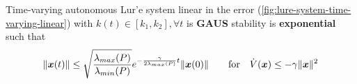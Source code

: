 \begin{corollary}
    Time-varying autonomous Lur'e system linear in the error (\cref{fig:lure-system-time-varying-linear})
    with $k(t) \in [k_1,k_2], \forall t$ is \textbf{GAUS} stability is \textbf{exponential} such that
    \[
        \lVert\boldsymbol{x}(t)\rVert \leq \sqrt{\frac{\lambda_{max}(P)}{\lambda_{min}(P)}} e^{-\frac{\gamma}{2 \lambda_{max}(P)} t} \lVert\boldsymbol{x}(0)\rVert
        \qquad \text{for} \quad \dot{V}(\boldsymbol{x}) \leq -\gamma\lVert\boldsymbol{x}\rVert^2
    \]
\end{corollary}
